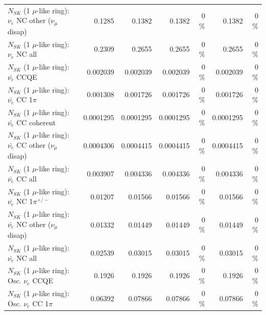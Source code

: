 \begin{table}
\begin{tabular}{| l | r | r | r  r | r  r |}
                $N_{SK}$ (1 $\mu$-like ring): $\nu_e$ NC other ($\nu_\mu$ disap) &          0.1285 &          0.1382 &          0.1382 &        0 \%  &          0.1382 &        0 \%  \\ 
                                  $N_{SK}$ (1 $\mu$-like ring): $\nu_{e}$ NC all &          0.2309 &          0.2655 &          0.2655 &        0 \%  &          0.2655 &        0 \%  \\ 
\hline
\hline
\hline
                                $N_{SK}$ (1 $\mu$-like ring): $\bar{\nu_e}$ CCQE &        0.002039 &        0.002039 &        0.002039 &        0 \%  &        0.002039 &        0 \%  \\ 
                           $N_{SK}$ (1 $\mu$-like ring): $\bar{\nu_e}$ CC 1$\pi$ &        0.001308 &        0.001726 &        0.001726 &        0 \%  &        0.001726 &        0 \%  \\ 
                         $N_{SK}$ (1 $\mu$-like ring): $\bar{\nu_e}$ CC coherent &       0.0001295 &       0.0001295 &       0.0001295 &        0 \%  &       0.0001295 &        0 \%  \\ 
          $N_{SK}$ (1 $\mu$-like ring): $\bar{\nu_e}$ CC other ($\nu_\mu$ disap) &       0.0004306 &       0.0004415 &       0.0004415 &        0 \%  &       0.0004415 &        0 \%  \\ 
                            $N_{SK}$ (1 $\mu$-like ring): $\bar{\nu_{e}}$ CC all &        0.003907 &        0.004336 &        0.004336 &        0 \%  &        0.004336 &        0 \%  \\ 
\hline
                     $N_{SK}$ (1 $\mu$-like ring): $\bar{\nu_e}$ NC 1$\pi^{+/-}$ &         0.01207 &         0.01566 &         0.01566 &        0 \%  &         0.01566 &        0 \%  \\ 
          $N_{SK}$ (1 $\mu$-like ring): $\bar{\nu_e}$ NC other ($\nu_\mu$ disap) &         0.01332 &         0.01449 &         0.01449 &        0 \%  &         0.01449 &        0 \%  \\ 
                            $N_{SK}$ (1 $\mu$-like ring): $\bar{\nu_{e}}$ NC all &         0.02539 &         0.03015 &         0.03015 &        0 \%  &         0.03015 &        0 \%  \\ 
\hline
\hline
\hline
                                 $N_{SK}$ (1 $\mu$-like ring): Osc. $\nu_e$ CCQE &          0.1926 &          0.1926 &          0.1926 &        0 \%  &          0.1926 &        0 \%  \\ 
                            $N_{SK}$ (1 $\mu$-like ring): Osc. $\nu_e$ CC 1$\pi$ &         0.06392 &         0.07866 &         0.07866 &        0 \%  &         0.07866 &        0 \%  \\ 

\end{tabular}
\end{table}
